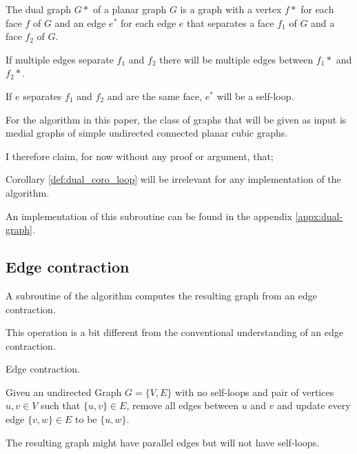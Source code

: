 \documentclass{article}
\begin{document}
		\begin{definition}
			The dual graph $G*$ of a planar graph $G$ is a graph with a vertex $f*$ for each face $f$ of $G$ and an edge $e^*$ for each edge $e$ that separates a face $f_1$ of $G$ and a face $f_2$ of $G$.
		\end{definition}
		
		\begin{corollary}
			If multiple edges separate $f_1$ and $f_2$ there will be multiple edges between $f_1*$ and $f_2*$.
		\end{corollary}
		
		\begin{corollary}\label{def:dual_coro_loop}
			If $e$ separates $f_1$ and $f_2$ and are the same face, $e^*$ will be a self-loop.
		\end{corollary}
		
		For the algorithm in this paper, the class of graphs that will be given as input is medial graphs of simple undirected connected planar cubic graphs.
		
		I therefore claim, for now without any proof or argument, that; 
		
		\begin{claim}
			Corollary \ref{def:dual_coro_loop} will be irrelevant for any implementation of the algorithm.
		\end{claim}
		
		An implementation of this subroutine can be found in the appendix \ref{appx:dual-graph}.
		
	\subsection{Edge contraction}

		A subroutine of the algorithm computes the resulting graph from an edge contraction.

		This operation is a bit different from the conventional understanding of an edge contraction.

		\begin{definition}
			Edge contraction.

			Given an undirected Graph $G=\{V,E\}$ with no self-loops and pair of vertices $u,v \in V$ such that $\{u,v\} \in E$, remove all edges between $u$ and $v$ and update every edge $\{v,w\} \in E$ to be $\{u,w\}$.
		\end{definition}

		The resulting graph might have parallel edges but will not have self-loops.
\end{document}
